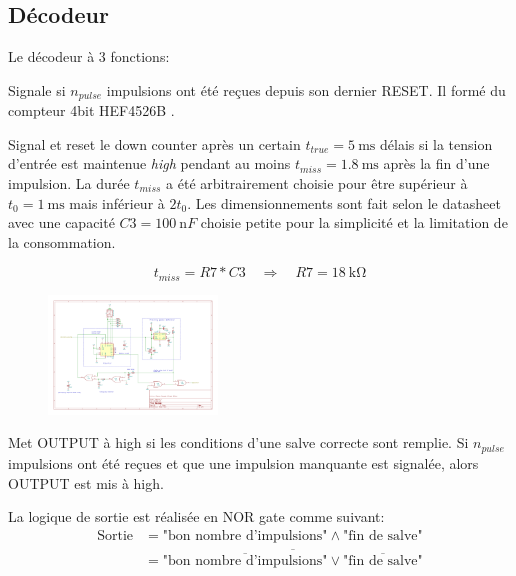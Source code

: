 \documentclass[french]{layout/Report}
\begin{document}
\subsection{Décodeur}
Le décodeur à 3 fonctions:

\begin{description}[leftmargin=!,labelwidth=4cm, labelindent=\parindent]
	\item[Down counter]
        Signale si $n_{pulse}$ impulsions ont été reçues depuis son dernier RESET.
        Il formé du compteur 4bit HEF4526B \cite{HEF4526B}.

	\item[Missing pulse detector]
        Signal et reset le down counter après un certain $t_{true} = \SI{5}{\milli\second}$ délais si la tension d'entrée est maintenue \emph{high} pendant au moins $t_{miss} = \SI{1.8}{\milli\second}$ après la fin d'une impulsion.
        La durée $t_{miss}$ a été arbitrairement choisie pour être supérieur à $t_0 = \SI{1}{\milli\second}$ mais inférieur à $2t_0$.
        Les dimensionnements sont fait selon le datasheet \cite{TLC555} avec une capacité $\mathit{C3} = \SI{100}{\nano F}$ choisie petite pour la simplicité et la limitation de la consommation.

		\begin{equation*}
			t_{miss} = \mathit{R7}*\mathit{C3} \quad\Rightarrow\quad \mathit{R7} = \SI{18}{\kilo\ohm}
		\end{equation*}

		\begin{figure}[H]
			\centering
			\includegraphics[width=0.4\textwidth]{fig/missing_pulse_detector.pdf}
		\end{figure}


	\item[Logic]
        Met OUTPUT à high si les conditions d'une salve correcte sont remplie.
        Si $n_{pulse}$ impulsions ont été reçues et que une impulsion manquante est signalée, alors OUTPUT est mis à high.

        La logique de sortie est réalisée en NOR gate comme suivant:
        \begin{align*}
        \text{Sortie} & = \text{"bon nombre d'impulsions"} \land \text{"fin de salve"} \\
        & = \overline{\overline{\text{"bon nombre d'impulsions"}} \lor \overline{\text{"fin de salve"}}}
        \end{align*}


\end{description}
\end{document}
